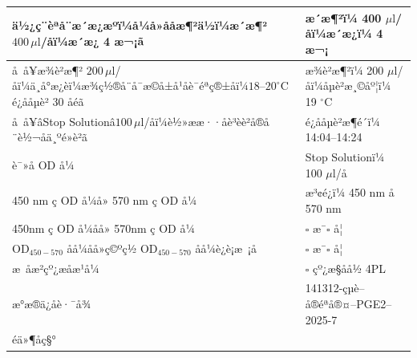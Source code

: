 \documentclass[UTF8,10pt,a4paper,fontset=fandol]{ctexart}
\newcommand{\fieldvalue}[1]{#1}
\newcommand{\handwritten}[1]{#1}
\begin{document}
\begin{center}
\begin{center}
\begin{tabularx}{\textwidth}{|p{}|X|}
\hline
ä½¿ç¨èªå¨æ´æ¿æºï¼å¼å»å­åæ¶²ä½ï¼æ´æ¶² $400\,\mu\mathrm{l}$/å­ï¼æ´æ¿ 4 æ¬¡ã&
æ´æ¶²ï¼
\fieldvalue{\handwritten{400}} $\mu\mathrm{l}$/å­ï¼æ´æ¿ï¼
\fieldvalue{\handwritten{4}} æ¬¡\\
\hline
å å¥æ¾è²æ¶² $200\,\mu\mathrm{l}$/å­ï¼ä¸å°æ¿èï¼æ¾ç½®å¨å¯æ©å±å¹å­è¯éªç®±åï¼$18$--$20^\circ\mathrm{C}$é¿åå­µè² $30$ åéã&
æ¾è²æ¶²ï¼
\fieldvalue{\handwritten{200}} $\mu\mathrm{l}$/å­ï¼å­µè²æ¸©åº¦ï¼
\fieldvalue{\handwritten{19}} $^\circ\mathrm{C}$\\
\hline
å å¥âStop Solutionâ$100\,\mu\mathrm{l}$/å­ï¼è½»ææ··åè³èè²å®å¨è½¬åä¸ºé»è²ã&
é¿åå­µè²æ¶é´ï¼
\fieldvalue{\handwritten{14:04--14:24}}\\
\hline
è¯»å OD å¼&
Stop Solutionï¼
\fieldvalue{\handwritten{100}} $\mu\mathrm{l}$/å­\\
\hline
450 nm ç OD å¼å» 570 nm ç OD å¼&
æ³¢é¿ï¼
\fieldvalue{\handwritten{450}} nm å
\fieldvalue{\handwritten{570}} nm\\
\hline
450nm ç OD å¼åå» 570nm ç OD å¼&
$\square$ æ¯\quad $\square$ å¦\\
\hline
OD$_{450-570}$ åå¼åå»ç©ºç½ OD$_{450-570}$ åå¼è¿è¡æ ¡å&
$\square$ æ¯\quad $\square$ å¦\\
\hline
æ åæ²çº¿æåæ¹å¼&
$\square$ çº¿æ§åå½\quad
\fieldvalue{4PL}\\
\hline
æ°æ®ä¿å­è·¯å¾&
\fieldvalue{\handwritten{141312-çµè--å®éªå®¤--PGE2--2025-7}}\\
\hline
éä»¶åç§°&

\end{tabularx}
\end{center}
\end{center}
\end{document}
